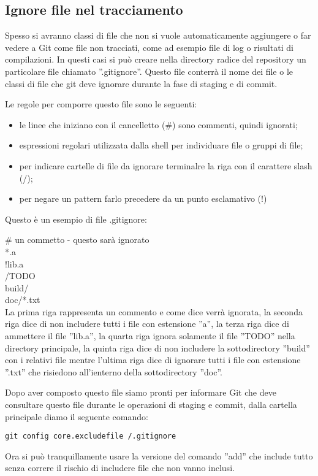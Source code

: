 \subsection{Ignore file nel tracciamento}
Spesso si avranno classi di file che non si vuole automaticamente aggiungere o far vedere a Git come file non tracciati, come ad esempio file di log o risultati di compilazioni. In questi casi si può creare nella directory radice del repository un particolare file chiamato ''.gitignore''. Questo file conterrà il nome dei file o le classi di file che git deve ignorare durante la fase di staging e di commit.

Le regole per comporre questo file sono le seguenti:

\begin{itemize}
\item le linee che iniziano con il cancelletto (\#)  sono commenti, quindi ignorati;
\item espressioni regolari utilizzata dalla shell per individuare file o gruppi di file;
\item per indicare cartelle di file da ignorare terminalre la riga con il carattere slash (/);
\item per negare un pattern farlo precedere da un punto esclamativo (!)
\end{itemize}

Questo è un esempio di file .gitignore:

\# un commetto - questo sarà ignorato\\
*.a\\
!lib.a\\
/TODO\\
build/\\
doc/*.txt\\

La prima riga rappresenta un commento e come dice verrà ignorata, la seconda riga dice di non includere tutti i file con estensione ''a'', la terza riga dice di ammettere il file ''lib.a'', la quarta riga ignora solamente il file ''TODO'' nella directory principale, la quinta riga dice di non includere la sottodirectory ''build'' con i relativi file mentre l'ultima riga dice di ignorare tutti i file con estensione ''.txt'' che risiedono all'ienterno della sottodirectory ''doc''.

Dopo aver composto questo file siamo pronti per informare Git che deve consultare questo file durante le operazioni di staging e commit, dalla cartella principale diamo il seguente comando:

\begin{center}
\texttt{git config core.excludefile /.gitignore}
\end{center}

Ora si può tranquillamente usare la versione del comando ''add'' che include tutto senza correre il rischio di includere file che non vanno inclusi.